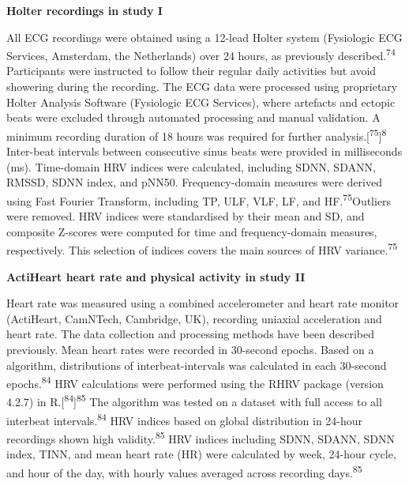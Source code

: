 \documentclass[
  letterpaper,
  headsepline=true,
  open=any]{scrbook}
\begin{document}
\begin{table}
\begin{minipage}[t]{\linewidth}
{}

\end{minipage}%

\end{table}

\textbf{Holter recordings in study I}

All ECG recordings were obtained using a 12-lead Holter system
(Fysiologic ECG Services, Amsterdam, the Netherlands) over 24 hours, as
previously described.\textsuperscript{74} Participants were instructed
to follow their regular daily activities but avoid showering during the
recording. The ECG data were processed using proprietary Holter Analysis
Software (Fysiologic ECG Services), where artefacts and ectopic beats
were excluded through automated processing and manual validation. A
minimum recording duration of 18 hours was required for further
analysis.{[}\textsuperscript{75}{]}\textsuperscript{8} Inter-beat
intervals between consecutive sinus beats were provided in milliseconds
(ms). Time-domain HRV indices were calculated, including SDNN, SDANN,
RMSSD, SDNN index, and pNN50. Frequency-domain measures were derived
using Fast Fourier Transform, including TP, ULF, VLF, LF, and
HF.\textsuperscript{75}Outliers were removed. HRV indices were
standardised by their mean and SD, and composite Z-scores were computed
for time and frequency-domain measures, respectively. This selection of
indices covers the main sources of HRV variance.\textsuperscript{75}

\textbf{ActiHeart heart rate and physical activity in study II}

Heart rate was measured using a combined accelerometer and heart rate
monitor (ActiHeart, CamNTech, Cambridge, UK), recording uniaxial
acceleration and heart rate. The data collection and processing methods
have been described previously. Mean heart rates were recorded in
30-second epochs. Based on a algorithm, distributions of
interbeat-intervals was calculated in each 30-second
epochs.\textsuperscript{84} HRV calculations were performed using the
RHRV package (version 4.2.7) in
R.{[}\textsuperscript{84}{]}\textsuperscript{85} The algorithm was
tested on a dataset with full access to all interbeat
intervals.\textsuperscript{84} HRV indices based on global distribution
in 24-hour recordings shown high validity.\textsuperscript{85} HRV
indices including SDNN, SDANN, SDNN index, TINN, and mean heart rate
(HR) were calculated by week, 24-hour cycle, and hour of the day, with
hourly values averaged across recording days.\textsuperscript{85}
\end{document}
